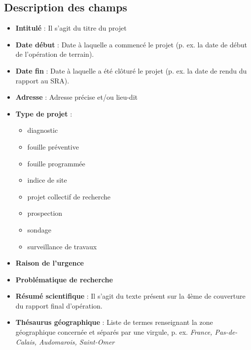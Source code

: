\documentclass[letterpaper,10pt,french]{sphinxmanual}
\begin{document}
\subsection{Description des champs}
\label{manuel/formulaire_projet:description-des-champs}\begin{itemize}
\item {} 
\textbf{Intitulé} : Il s'agit du titre du projet

\item {} 
\textbf{Date début} : Date à laquelle a commencé le projet (p. ex. la date de début de l'opération de terrain).

\item {} 
\textbf{Date fin} : Date à laquelle a été clôturé le projet (p. ex. la date de rendu du rapport au SRA).

\item {} 
\textbf{Adresse} : Adresse précise et/ou lieu-dit

\item {} 
\textbf{Type de projet} :
\begin{itemize}
\item {} 
diagnostic

\item {} 
fouille préventive

\item {} 
fouille programmée

\item {} 
indice de site

\item {} 
projet collectif de recherche

\item {} 
prospection

\item {} 
sondage

\item {} 
surveillance de travaux

\end{itemize}

\item {} 
\textbf{Raison de l'urgence}

\item {} 
\textbf{Problématique de recherche}

\item {} 
\textbf{Résumé scientifique} : Il s'agit du texte présent sur la 4ème de couverture du rapport final d'opération.

\item {} 
\textbf{Thésaurus géographique} : Liste de termes renseignant la zone géographique concernée et séparés par une virgule, p. ex. \emph{France, Pas-de-Calais, Audomarois, Saint-Omer}


\end{itemize}
\end{document}
